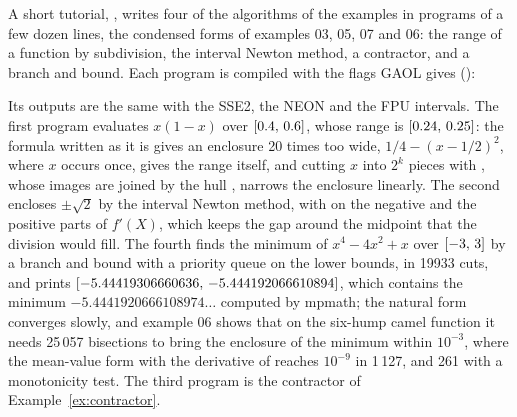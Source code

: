 \documentclass[12pt,a4paper,twoside,openright]{book}
\begin{document}
\medskip
A short tutorial, , writes four of the algorithms
of the examples in programs of a few dozen lines, the condensed forms of
examples 03, 05, 07 and 06: the range of a function by subdivision, the
interval Newton method, a contractor, and a branch and bound. Each program
is compiled with the flags GAOL gives ():
\begin{cmdshell}
\end{cmdshell}
Its outputs are the same with the SSE2, the NEON and the FPU intervals.
The first program evaluates $x(1-x)$ over
$[0.4,\,0.6]$, whose range is $[0.24,\,0.25]$: the formula written as
it is gives an enclosure 20 times too wide, $1/4-(x-1/2)^2$, where $x$
occurs once, gives the range itself, and cutting $x$ into $2^k$ pieces with
, whose images are joined by the hull \code{|}, narrows
the enclosure linearly. The second encloses $\pm\sqrt2$ by the interval
Newton method, with  on the negative and the positive parts
of $f'(X)$, which keeps the gap around the midpoint that the division
\code{/} would fill. The fourth finds the minimum of $x^4-4x^2+x$ over
$[-3,\,3]$ by a branch and bound with a priority queue on the lower
bounds, in 19933 cuts, and prints
$[-5.44419306660636,\,-5.444192066610894]$, which contains the minimum
$-5.4441920666108974\ldots$ computed by mpmath; the natural form converges
slowly, and example 06 shows that on the six-hump camel function it needs
25\,057 bisections to bring the enclosure of the minimum within $10^{-3}$,
where the mean-value form with the derivative of  reaches
$10^{-9}$ in 1\,127, and 261 with a monotonicity test. The third program is
the contractor of Example~\ref{ex:contractor}.
\end{document}
